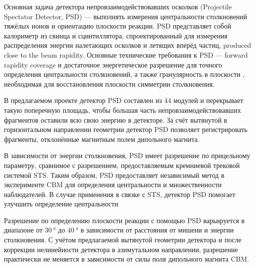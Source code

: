 \begin{minipage}[t]{0.495\textwidth}
Основная задача детектора непровзаимодействовавших осколков (Projectile Spectator Detector, PSD) --- выполнять измерения центральности столкновений тяжёлых ионов и ориентацию плоскости реакции. PSD представляет собой калориметр из свинца и сцинтиллятора, спроектированный для измерения распределения энергии налетающих осколков и летящих вперёд частиц, produced close to the beam rapidity.
Основные технические требования к PSD --- forward rapidity coverage и достаточное энергетическое разрешение для точного определения центральности столкновений, а также гранулярность в плоскости \todo, необходимая для восстановления плоскости симметрии столкновения. \\

\end{minipage}

В предлагаемом проекте детектор PSD составлен из 44 модулей и перекрывает такую поперечную площадь, чтобы большая часть непровзаимодействовавших фрагментов оставили всю свою энергию в детекторе. За счёт вытянутой в горизонтальном направлении геометрии детектор PSD позволяет регистрировать фрагменты, отклонённые магнитным полем дипольного магнита.

В зависимости от энергии столкновения, PSD имеет разрешение по прицельному параметру, сравнимое с разрешением, предоставляемым кремниевой трековой системой STS. Таким образом, PSD предоставляет независимый метод в эксперименте CBM для определения центральности и множественности наблюдателей. В случае применения в связке с STS, детектор PSD помогает улучшить определение центральности 

Разрешение по определению плоскости реакции с помощью PSD варьируется в диапазоне от $\SI{30}{\degree}$ до $\SI{40}{\degree}$ в зависимости от расстояния от мишени и энергии столкновения. С учётом предлагаемой вытянутой геометрии детектора и после коррекции нелинейности детектора в азимутальном направлении, разрешение практически не меняется в зависимости от силы поля дипольного магнита CBM.

